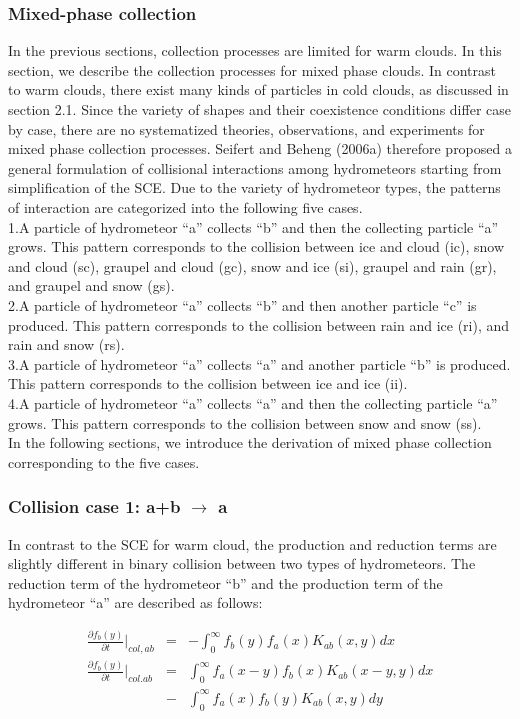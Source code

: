 \subsubsection{Mixed-phase collection}
In the previous sections, collection processes are limited for warm clouds. In this section, we describe the collection processes for mixed phase clouds. In contrast to warm clouds, there exist many kinds of particles in cold clouds, as discussed in section 2.1. Since the variety of shapes and their coexistence conditions differ case by case, there are no systematized theories, observations, and experiments for mixed phase collection processes. Seifert and Beheng (2006a) therefore proposed a general formulation of collisional interactions among hydrometeors starting from simplification of the SCE. Due to the variety of hydrometeor types, the patterns of interaction are categorized into the following five cases.\\
1.A particle of hydrometeor “a” collects “b” and then the collecting particle “a” grows. This pattern corresponds to the collision between ice and cloud (ic), snow and cloud (sc), graupel and cloud (gc), snow and ice (si), graupel and rain (gr), and graupel and snow (gs).\\
2.A particle of hydrometeor “a” collects “b” and then another particle “c” is produced. This pattern corresponds to the collision between rain and ice (ri), and rain and snow (rs).\\
3.A particle of hydrometeor “a” collects “a” and another particle “b” is produced. This pattern corresponds to the collision between ice and ice (ii).\\
4.A particle of hydrometeor “a” collects “a” and then the collecting particle “a” grows. This pattern corresponds to the collision between snow and snow (ss).\\
In the following sections, we introduce the derivation of mixed phase collection corresponding to the five cases.

\subsubsection{Collision case 1: a+b $\rightarrow$ a}
In contrast to the SCE for warm cloud, the production and reduction terms are slightly different in binary collision between two types of hydrometeors. The reduction term of the hydrometeor “b” and the production term of the hydrometeor “a” are described as follows:

\begin{eqnarray}
\frac{\partial f_{b}(y)}{\partial t}\Bigr|_{col,ab}&=&-\int_{0}^{\infty}f_{b}(y)f_{a}(x)K_{ab}(x,y)dx\label{sn156}\\
\frac{\partial f_{b}(y)}{\partial t}\Bigr|_{col.ab}&=&\int_{0}^{\infty}f_{a}(x-y)f_{b}(x)K_{ab}(x-y,y)dx\nonumber\\
&-&\int_{0}^{\infty}f_{a}(x)f_{b}(y)K_{ab}(x,y)dy\label{sn157}
\end{eqnarray}

